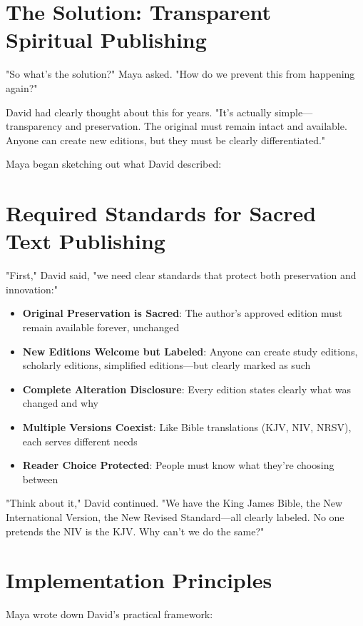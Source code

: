 \documentclass[11pt,twoside]{book}
\begin{document}
\section*{The Solution: Transparent Spiritual Publishing}
\label{sec:org8fb6b4c}

"So what's the solution?" Maya asked. "How do we prevent this from happening again?"

David had clearly thought about this for years. "It's actually simple—transparency and preservation. The original must remain intact and available. Anyone can create new editions, but they must be clearly differentiated."

Maya began sketching out what David described:
\section*{Required Standards for Sacred Text Publishing}
\label{sec:org8cc29d5}

"First," David said, "we need clear standards that protect both preservation and innovation:"

\begin{itemize}
\item \textbf{\textbf{Original Preservation is Sacred}}: The author's approved edition must remain available forever, unchanged
\item \textbf{\textbf{New Editions Welcome but Labeled}}: Anyone can create study editions, scholarly editions, simplified editions—but clearly marked as such
\item \textbf{\textbf{Complete Alteration Disclosure}}: Every edition states clearly what was changed and why
\item \textbf{\textbf{Multiple Versions Coexist}}: Like Bible translations (KJV, NIV, NRSV), each serves different needs
\item \textbf{\textbf{Reader Choice Protected}}: People must know what they're choosing between
\end{itemize}

"Think about it," David continued. "We have the King James Bible, the New International Version, the New Revised Standard—all clearly labeled. No one pretends the NIV is the KJV. Why can't we do the same?"
\section*{Implementation Principles}
\label{sec:org781953b}

Maya wrote down David's practical framework:
\end{document}
